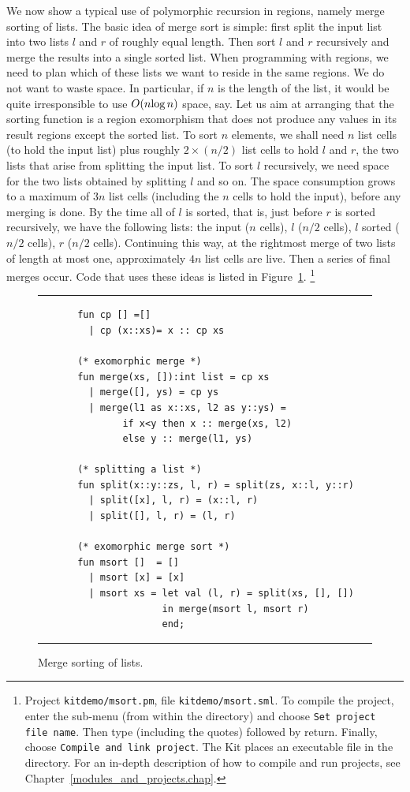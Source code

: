 \documentclass[12pt]{book}
\begin{document}
We now show a typical use of polymorphic recursion in regions, namely
merge sorting of lists. The basic idea of merge sort is simple: first
split the input list into two lists $l$ and $r$ of roughly equal
length.  Then sort $l$ and $r$ recursively and merge the results into
a single sorted list.  When programming with regions, we need to plan
which of these lists we want to reside in the same regions. We do not
want to waste space. In particular, if $n$ is the length of the list,
it would be quite irresponsible to use $O(n\hbox{log}\,n)$ space, say.
Let us aim at arranging that the sorting function is a region
exomorphism that does not produce any values in its result regions
except the sorted list. To sort $n$ elements, we shall need $n$ list
cells (to hold the input list) plus roughly $2\times(n/2)$ list cells
to hold $l$ and $r$, the two lists that arise from splitting the input
list. To sort $l$ recursively, we need space for the two lists
obtained by splitting $l$ and so on. The space consumption grows to a
maximum of $3n$ list cells (including the $n$ cells to hold the
input), before any merging is done.  By the time all of $l$ is sorted,
that is, just before $r$ is sorted recursively, we have the following
lists: the input ($n$ cells), $l$ ($n/2$ cells), $l$ sorted ($n/2$
cells), $r$ ($n/2$ cells). Continuing this way, at the rightmost merge
of two lists of length at most one, approximately $4n$ list cells are
live.  Then a series of final merges occur.  Code that uses these
ideas is listed in Figure~\ref{msort.fig}.
%
\footnote{Project
  {\tt kitdemo/msort.pm}, file {\tt kitdemo/msort.sml}. To compile the
  project, enter the  sub-menu (from within the
   directory) and choose {\tt Set project file name}.
  Then type  (including the quotes) followed by
  return. Finally, choose {\tt Compile and link project}. The Kit
  places an executable file  in the 
  directory. For an in-depth description of how to compile and run
  projects, see Chapter~\ref{modules_and_projects.chap}.}
\begin{figure}[t]
\hrule\medskip
\begin{verbatim}
       fun cp [] =[]
         | cp (x::xs)= x :: cp xs

       (* exomorphic merge *)
       fun merge(xs, []):int list = cp xs
         | merge([], ys) = cp ys
         | merge(l1 as x::xs, l2 as y::ys) = 
               if x<y then x :: merge(xs, l2) 
               else y :: merge(l1, ys)

       (* splitting a list *)
       fun split(x::y::zs, l, r) = split(zs, x::l, y::r)
         | split([x], l, r) = (x::l, r)
         | split([], l, r) = (l, r)

       (* exomorphic merge sort *)
       fun msort []  = []
         | msort [x] = [x]
         | msort xs = let val (l, r) = split(xs, [], [])
                      in merge(msort l, msort r)
                      end;
\end{verbatim}
\caption{Merge sorting of lists.}
\label{msort.fig}
\medskip\hrule
\end{figure}
\end{document}

